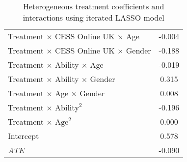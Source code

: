 \begin{table}[]
\begin{tabular}{lc}
  Treatment $\times$ CESS Online UK $\times$ Age & -0.004 \\ 
  Treatment $\times$ CESS Online UK $\times$ Gender & -0.188 \\ 
  Treatment $\times$ Ability $\times$ Age & -0.019 \\ 
  Treatment $\times$ Ability $\times$ Gender & 0.315 \\ 
  Treatment $\times$ Age $\times$ Gender & 0.008 \\ 
  Treatment $\times$ $\text{Ability}^2$ & -0.196 \\ 
  Treatment $\times$ $\text{Age}^2$ & 0.000 \\ 
  Intercept & 0.578 \\ 
   \hline
\textit{ATE} & -0.090 \\ 
   \hline
\hline
\end{tabular}
\caption{Heterogeneous treatment coefficients and interactions using iterated LASSO model} 
\label{tab:hetero}
\end{table}

